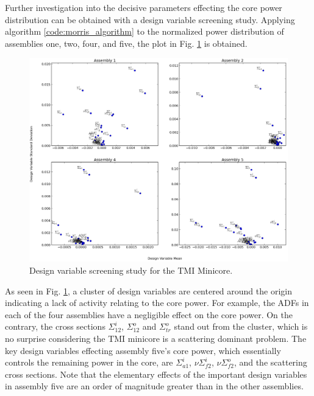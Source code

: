 Further investigation into the decisive parameters effecting the core power distribution can be obtained with a design variable screening study. Applying algorithm \ref{code:morris_algorithm} to the normalized power distribution of assemblies one, two, four, and five, the plot in Fig. \ref{fig:tmi_screening_study} is obtained. 
\begin{figure}[htb]
\caption[Design variable screening study for the \ac{TMI} Minicore.]{\label{fig:tmi_screening_study}
Design variable screening study for the \ac{TMI} Minicore.}
 \begin{center}
  \includegraphics[scale=.3]{./Chapter3/tmi_important_vars.png}
 \end{center}
\end{figure}
As seen in Fig. \ref{fig:tmi_screening_study}, a cluster of design variables are centered around the origin indicating a lack of activity relating to the core power. For example, the \ac{ADFs} in each of the four assemblies have a negligible effect on the core power. On the contrary, the cross sections $\Sigma_{12}^i$, $\Sigma_{12}^o$ and $\Sigma_{tr}^o$ stand out from the cluster, which is no surprise considering the \ac{TMI} minicore is a scattering dominant problem. The key design variables effecting assembly five's core power, which essentially controls the remaining power in the core, are $\Sigma_{a1}^i$, $\nu\Sigma_{f2}^i$, $\nu\Sigma_{f2}^o$, and the scattering cross sections. Note that the elementary effects of the important design variables in assembly five are an order of magnitude greater than in the other assemblies.

